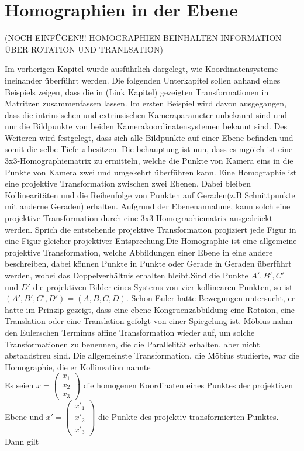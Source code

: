 \chapter{Homographien in der Ebene}


(NOCH EINFÜGEN!!! HOMOGRAPHIEN BEINHALTEN INFORMATION ÜBER ROTATION UND TRANLSATION)

Im vorherigen Kapitel wurde ausführlich dargelegt, wie Koordinatensysteme ineinander überführt werden. Die folgenden Unterkapitel sollen anhand eines Beispiels zeigen, dass die in (Link Kapitel) gezeigten Transformationen in Matritzen zusammenfassen lassen. Im ersten Beispiel wird davon ausgegangen, dass die intrinsischen und extrinsischen Kameraparameter unbekannt sind und nur die Bildpunkte von beiden Kamerakoordinatensystemen bekannt sind. Des Weiteren wird festgelegt, dass sich alle Bildpunkte auf einer Ebene befinden und somit die selbe Tiefe $z$ besitzen. Die behauptung ist nun, dass es mgöich ist eine 3x3-Homographiematrix zu ermitteln, welche die Punkte von Kamera eins in die Punkte von Kamera zwei und umgekehrt überführen kann. Eine Homographie ist eine projektive Transformation zwischen zwei Ebenen. Dabei bleiben Kollinearitäten und die Reihenfolge von Punkten auf Geraden(z.B Schnittpunkte mit anderne Geraden) erhalten. Aufgrund der Ebenenannahme, kann solch eine projektive Transformation durch eine 3x3-Homograohiematrix ausgedrückt werden\cite{Roser}. Sprich die entstehende projektive Transformation projiziert jede Figur in eine Figur gleicher projektiver Entsprechung\cite{HZ}.Die Homographie ist eine allgemeine projektive Transformation, welche Abbildungen einer Ebene in eine andere beschreiben, dabei können Punkte in Punkte oder Gerade in Geraden überführt werden, wobei das Doppelverhältnis erhalten bleibt.Sind die Punkte $A',B',C'$ und $D'$ die projektiven Bilder eines Systems von vier kollinearen Punkten, so ist $(A',B',C',D') =(A,B,C,D)$\cite{Peiffer}. Schon Euler hatte Bewegungen untersucht, er hatte im Prinzip gezeigt, dass eine ebene Kongruenzabbildung eine Rotaion, eine Translation oder eine Translation gefolgt von einer Spiegelung ist. Möbius nahm den Eulerschen Terminus affine Transformation wieder auf, um solche Transformationen zu benennen, die die Parallelität erhalten, aber nicht abstandstreu sind. Die allgemeinste Transformation, die Möbius studierte, war die Homographie, die er Kollineation nannte\cite{Peiffer}\\



 
Es seien \ensuremath{x = \begin{pmatrix}
		x_1\\x_2\\x_3
\end{pmatrix}} die homogenen Koordinaten eines Punktes der projektiven Ebene und \ensuremath{x' = \begin{pmatrix}
x'_1\\x'_2\\x'_3
\end{pmatrix}} die Punkte des projektiv transformierten Punktes. Dann gilt

